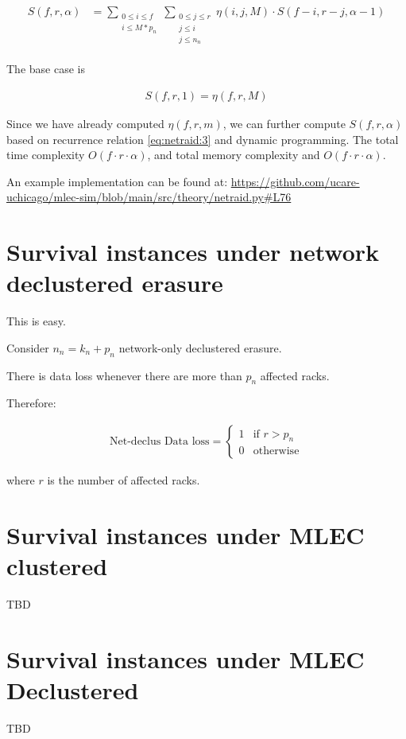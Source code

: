 \documentclass{article}
\begin{document}
\begin{eqnarray}
\begin{aligned}
  S(f,r,\alpha)
  &= \sum_{\substack{0 \leq i \leq f \\ i \leq M*p_n}}
  \sum_{\substack{0 \leq j \leq r \\ j \leq i \\ j \leq n_n}}
  \eta(i,j,M) \cdot S(f-i, r-j, \alpha-1)
\end{aligned}
\label{eq:netraid:3}
\end{eqnarray}

The base case is 

\begin{eqnarray}
  S(f,r,1) =  \eta(f,r,M)
\label{eq:netraid:4}
\end{eqnarray}

Since we have already computed $\eta(f,r,m)$, we can further compute $S(f,r,\alpha)$ based on recurrence relation \ref{eq:netraid:3} and dynamic programming. The total time complexity $O(f \cdot r \cdot \alpha)$, and total memory complexity and $O(f \cdot r \cdot \alpha)$.

An example implementation can be found at: \url{https://github.com/ucare-uchicago/mlec-sim/blob/main/src/theory/netraid.py#L76}






\section{Survival instances under network declustered erasure}

This is easy.

Consider $n_n=k_n+p_n$ network-only declustered erasure.

There is data loss whenever there are more than $p_n$ affected racks.

Therefore:

\begin{eqnarray}
  \text{Net-declus Data loss} =
    \begin{cases}
      1 & \text{if $r > p_n$}\\
      0 & \text{otherwise}
    \end{cases}       
\label{eq:net_dp:1}
\end{eqnarray}

where $r$ is the number of affected racks.

\section{Survival instances under MLEC clustered}

TBD

\section{Survival instances under MLEC Declustered}

TBD
\end{document}
